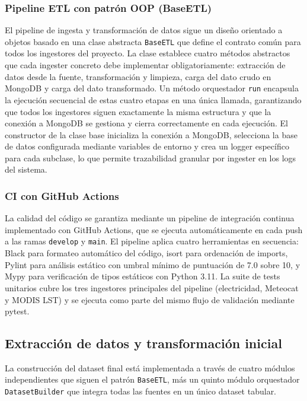 \documentclass[12pt, a4paper]{article}
\begin{document}
\subsubsection{Pipeline ETL con patrón OOP (BaseETL)}

El pipeline de ingesta y transformación de datos sigue un diseño orientado a objetos basado en una clase abstracta \texttt{BaseETL} que define el contrato común para todos los ingestores del proyecto. La clase establece cuatro métodos abstractos que cada ingester concreto debe implementar obligatoriamente: extracción de datos desde la fuente, transformación y limpieza, carga del dato crudo en MongoDB y carga del dato transformado. Un método orquestador \texttt{run} encapsula la ejecución secuencial de estas cuatro etapas en una única llamada, garantizando que todos los ingestores siguen exactamente la misma estructura y que la conexión a MongoDB se gestiona y cierra correctamente en cada ejecución. El constructor de la clase base inicializa la conexión a MongoDB, selecciona la base de datos configurada mediante variables de entorno y crea un logger específico para cada subclase, lo que permite trazabilidad granular por ingester en los logs del sistema.

\subsubsection{CI con GitHub Actions}

La calidad del código se garantiza mediante un pipeline de integración continua implementado con GitHub Actions, que se ejecuta automáticamente en cada push a las ramas \texttt{develop} y \texttt{main}. El pipeline aplica cuatro herramientas en secuencia: Black para formateo automático del código, isort para ordenación de imports, Pylint para análisis estático con umbral mínimo de puntuación de 7.0 sobre 10, y Mypy para verificación de tipos estáticos con Python 3.11. La suite de tests unitarios cubre los tres ingestores principales del pipeline (electricidad, Meteocat y MODIS LST) y se ejecuta como parte del mismo flujo de validación mediante pytest.

\subsection{Extracción de datos y transformación inicial}

La construcción del dataset final está implementada a través de cuatro módulos independientes que siguen el patrón \texttt{BaseETL}, más un quinto módulo orquestador \texttt{DatasetBuilder} que integra todas las fuentes en un único dataset tabular.
\end{document}
